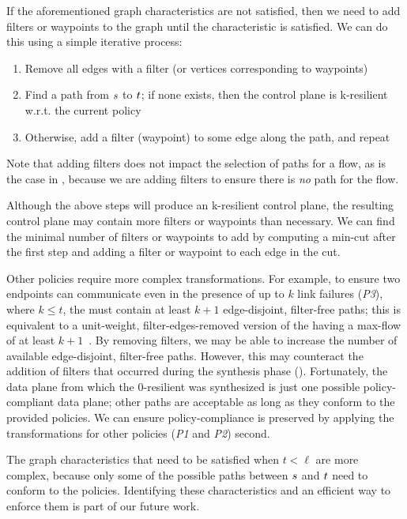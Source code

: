 If the aforementioned graph characteristics are not satisfied, then we need to
add filters or waypoints to the graph until the characteristic is satisfied.
We can do this using a simple iterative process: 
\begin{enumerate}
\vspace{-1ex}
\setlength{\topsep}{0pt}
\setlength{\itemsep}{0em}
\setlength{\parskip}{0pt}
\setlength{\parsep}{0pt}
\item Remove all edges with a filter (or vertices corresponding to waypoints) 
\item Find a path from $s$ to $t$; if none exists,
    then the control plane is k-resilient w.r.t. the current policy
\item Otherwise, add a filter (waypoint) to some edge along the path, and repeat
\vspace{-1ex}
\end{enumerate}
Note that adding filters does not impact the selection of paths for a flow, as
is the case in , because we are adding filters to
ensure there is {\em no} path for the flow.

Although the above steps will produce an k-resilient control plane, the
resulting control plane may contain more filters or waypoints than necessary.
We can find the minimal number of filters or waypoints to add by computing a
min-cut after the first step and adding a filter or waypoint to each edge in the cut. 

Other policies require more complex transformations. For example, to ensure
two endpoints can communicate even in the presence of up to $k$ link failures
({\em P3}), where $k \leq t$, the \ARC must contain at least $k+1$
edge-disjoint, filter-free paths; this is equivalent to a unit-weight,
filter-edges-removed version of the \ARC having a max-flow of at least
$k+1$~\cite{arc}. By removing filters, we may be able to increase the number
of available edge-disjoint, filter-free paths. However, this may counteract
the addition of filters that occurred during the \ARC synthesis phase
(). Fortunately, the data plane from which the
0-resilient \ARC was synthesized is just one possible policy-compliant data
plane; other paths are acceptable as long as they conform to the provided
policies. We can ensure policy-compliance is preserved by applying the
transformations for other policies ({\em P1} and {\em P2}) second.

The graph characteristics that need to be satisfied when $t < \ell$ are more
complex, because only some of the possible paths between $s$ and
$t$ need to conform to the policies. Identifying these
characteristics and an efficient way to enforce them is part of our future
work.

